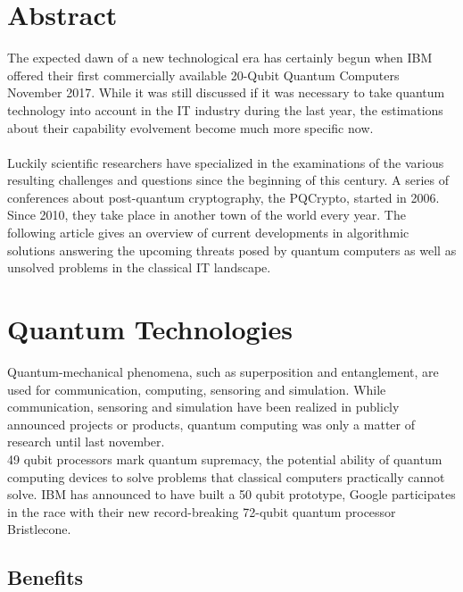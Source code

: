 \documentclass[a4paper,11pt]{article}
\begin{document}
\newpage
\setlength{\columnsep}{30pt}

\begin{multicols}{2}
 
\section{Abstract}

The expected dawn of a new technological era has certainly begun when IBM offered their first commercially available 20-Qubit Quantum Computers November 2017.
While it was still discussed if it was necessary to take quantum technology into account in the IT industry during the last year, the estimations about their capability evolvement become much more specific now.\\ \\
Luckily scientific researchers have specialized in the examinations of the various resulting challenges and questions since the beginning of this century. A series of conferences about post-quantum cryptography, the PQCrypto, started in 2006. Since 2010, they take place in another town of the world every year. The following article gives an overview of current developments in algorithmic solutions answering the upcoming threats posed by quantum computers as well as unsolved problems in the classical IT landscape. 
  

\section{Quantum Technologies}

Quantum-mechanical phenomena, such as superposition and entanglement, are used for communication, computing, sensoring and simulation. While communication, sensoring and simulation have been realized in publicly announced projects or products, quantum computing was only a matter of research until last november. \\
49 qubit processors mark quantum supremacy, the potential ability of quantum computing devices to solve problems that classical computers practically cannot solve. IBM has announced to have built a 50 qubit prototype, Google participates in the race with their new record-breaking 72-qubit quantum processor Bristlecone.

\subsection{Benefits}


\end{multicols}
\end{document}

